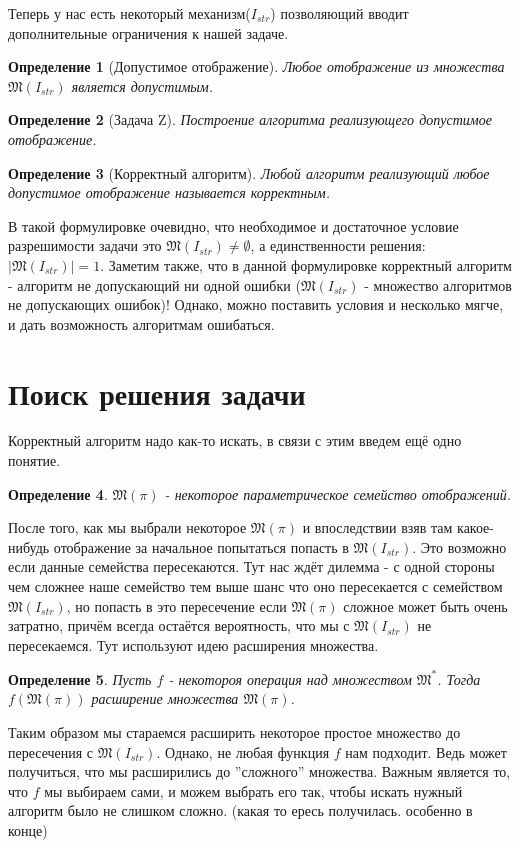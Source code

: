 \documentclass[a4paper, 12pt]{report}
\newtheorem*{definition}{Определение}
\begin{document}
Теперь у нас есть некоторый механизм($I_{str}$) позволяющий вводит дополнительные ограничения к нашей задаче.
\begin{definition}[Допустимое отображение]Любое отображение из множества $\mathfrak{M}(I_{str})$ является допустимым. \end{definition}
\begin{definition}[Задача Z] Построение алгоритма реализующего допустимое отображение. \end{definition}
\begin{definition}[Корректный алгоритм] Любой алгоритм реализующий любое допустимое отображение называется корректным. \end{definition}

В такой формулировке очевидно, что необходимое и достаточное условие разрешимости задачи это $\mathfrak{M}(I_{str})\neq\emptyset$, а единственности решения: $|\mathfrak{M}(I_{str})|=1$. 
Заметим также, что в данной формулировке корректный алгоритм - алгоритм не допускающий ни одной ошибки ($\mathfrak{M}(I_{str})$ - множество алгоритмов не допускающих ошибок)! Однако, можно поставить условия и несколько мягче, и дать возможность алгоритмам ошибаться.

\section{Поиск решения задачи}
Корректный алгоритм надо как-то искать, в связи с этим введем ещё одно понятие.

\begin{definition} $\mathfrak{M}(\pi)$ - некоторое параметрическое семейство отображений. \end{definition}

После того, как мы выбрали некоторое $\mathfrak{M}(\pi)$ и впоследствии взяв там какое-нибудь отображение за начальное попытаться попасть в $\mathfrak{M}(I_{str})$. Это возможно если данные семейства пересекаются. Тут нас ждёт дилемма - с одной стороны чем сложнее наше семейство тем выше шанс что оно пересекается с семейством $\mathfrak{M}(I_{str})$, но попасть в это пересечение если $\mathfrak{M}(\pi)$ сложное может быть очень затратно, причём всегда остаётся вероятность, что мы с $\mathfrak{M}(I_{str})$ не пересекаемся. Тут используют идею расширения множества.

\begin{definition} Пусть $f$ - некотороя операция над множеством $\mathfrak{M}^*$. Тогда $f(\mathfrak{M}(\pi))$ расширение множества $\mathfrak{M}(\pi)$. \end{definition}

Таким образом мы стараемся расширить некоторое простое множество до пересечения с $\mathfrak{M}(I_{str})$. Однако, не любая функция $f$ нам подходит. Ведь может получиться, что мы расширились до ''сложного'' множества. Важным является то, что $f$ мы выбираем сами, и можем выбрать его так, чтобы искать нужный алгоритм было не слишком сложно. (какая то ересь получилась. особенно в конце)
\end{document}

